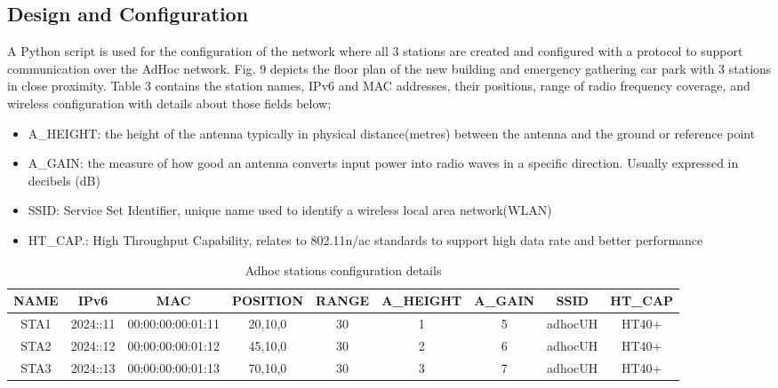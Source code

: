 \documentclass{article}
\begin{document}
\subsection{Design and Configuration}
A Python script is used for the configuration of the network where all 3 stations are created and configured with a protocol to support communication over the AdHoc network. Fig. 9 depicts the floor plan of the new building and emergency gathering car park with 3 stations in close proximity. Table 3 contains the station names, IPv6 and MAC addresses, their positions, range of radio frequency coverage, and wireless configuration with details about those fields below; 
	\begin{itemize}
		\item A\_HEIGHT: the height of the antenna typically in physical distance(metres) between the antenna and the ground or reference point
		\item A\_GAIN: the measure of how good an antenna converts input power into radio waves in a specific direction. Usually expressed in decibels (dB)
		\item SSID: Service Set Identifier, unique name used to identify a wireless local area network(WLAN)
		\item HT\_CAP.: High Throughput Capability, relates to 802.11n/ac standards to support high data rate and better performance 
	\end{itemize}
    	\begin{table}[h]
		\small
        		\begin{tabular}{|c|c|c|c|c|c|c|c|c|}
        			\hline
        			NAME & IPv6 & MAC & POSITION & RANGE & A\_HEIGHT & A\_GAIN & SSID & HT\_CAP\\
        			\hline
        			STA1 & 2024::11 & 00:00:00:00:01:11 & 20,10,0 & 30 & 1 & 5 & adhocUH & HT40+ \\
        			STA2 & 2024::12 & 00:00:00:00:01:12 & 45,10,0 & 30 & 2 & 6 & adhocUH & HT40+ \\
        			STA3 & 2024::13 & 00:00:00:00:01:13 & 70,10,0 & 30 & 3 & 7 & adhocUH & HT40+ \\
        			\hline
        		\end{tabular}
       	 	\caption{Adhoc stations configuration details}
        		\label{tab:3}
    	\end{table}
\newpage
\end{document}

